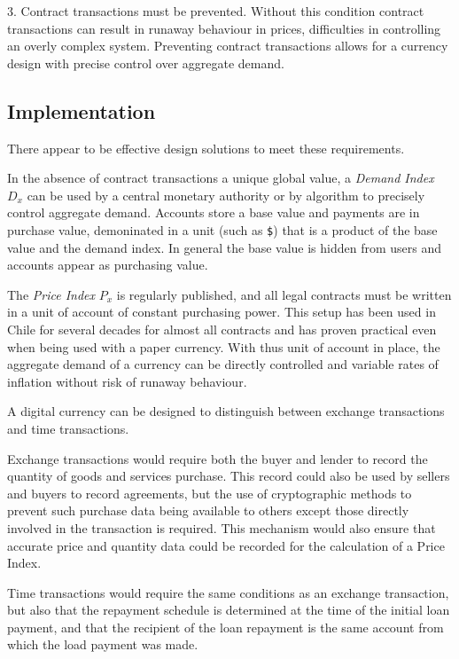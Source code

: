 3. Contract transactions must be prevented. Without this condition contract transactions can result
in runaway behaviour in prices, difficulties in controlling an overly complex system. Preventing
contract transactions allows for a currency design with precise control over aggregate demand.

\subsection{Implementation}
    
There appear to be effective design solutions to meet these requirements.

In the absence of contract transactions a unique global value, a \emph{Demand Index} $D_x$ can be
used by a central monetary authority or by algorithm to precisely control aggregate demand. Accounts
store a base value and payments are in purchase value, demoninated in a unit (such as \verb|$|) that
is a product of the base value and the demand index. In general the base value is hidden from users
and accounts appear as purchasing value.

The \emph{Price Index} $P_x$ is regularly published, and all legal contracts must be written in a
unit of account of constant purchasing power. This setup has been used in Chile for several decades
for almost all contracts and has proven practical even when being used with a paper currency. With
thus unit of account in place, the aggregate demand of a currency can be directly controlled and
variable rates of inflation without risk of runaway behaviour. 

A digital currency can be designed to distinguish between exchange transactions and time
transactions.

Exchange transactions would require both the buyer and lender to record the quantity of goods and
services purchase. This record could also be used by sellers and buyers to record agreements, but
the use of cryptographic methods to prevent such purchase data being available to others except
those directly involved in the transaction is required. This mechanism would also ensure that
accurate price and quantity data could be recorded for the calculation of a Price Index. 

Time transactions would require the same conditions as an exchange transaction, but also that the
repayment schedule is determined at the time of the initial loan payment, and that the recipient of
the loan repayment is the same account from which the load payment was made.

